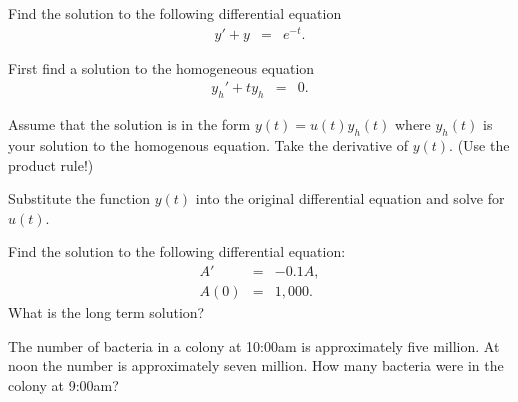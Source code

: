 


\begin{problem}
\item Find the solution to the following differential equation
  \begin{eqnarray*}
    y' + y & = & e^{-t}.
  \end{eqnarray*}

  \begin{subproblem}
  \item First find a solution to the homogeneous equation
  \begin{eqnarray*}
    y_h' + ty_h & = & 0.
  \end{eqnarray*}
    \vfill

  \item Assume that the solution is in the form $y(t) = u(t) y_h(t)$
    where $y_h(t)$ is your solution to the homogenous equation. Take
    the derivative of $y(t)$. (Use the product rule!)
    \vspace{2em}
      
  \item Substitute the function $y(t)$ into the original differential
    equation and solve for $u(t)$.
    \vfill

  \end{subproblem}
\end{problem}


  \begin{problem}
  \item Find the solution to the following differential equation:
    \begin{eqnarray*}
      A' & = & -0.1 A, \\
      A(0) & = & 1,000.
    \end{eqnarray*}
    What is the long term solution?
    \vfill
    \clearpage
  \item The number of bacteria in a colony at 10:00am is approximately
    five million. At noon the number is approximately seven
    million. How many bacteria were in the colony at 9:00am?
    \vfill
  \end{problem}


